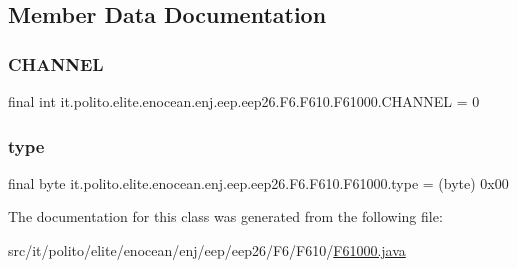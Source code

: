 \subsection{Member Data Documentation}
\hypertarget{classit_1_1polito_1_1elite_1_1enocean_1_1enj_1_1eep_1_1eep26_1_1_f6_1_1_f610_1_1_f61000_a3d5ee9532f23a1edda0fef17ab394f12}{}\label{classit_1_1polito_1_1elite_1_1enocean_1_1enj_1_1eep_1_1eep26_1_1_f6_1_1_f610_1_1_f61000_a3d5ee9532f23a1edda0fef17ab394f12} 
\subsubsection{\texorpdfstring{C\+H\+A\+N\+N\+EL}{CHANNEL}}
{\footnotesize\ttfamily final int it.\+polito.\+elite.\+enocean.\+enj.\+eep.\+eep26.\+F6.\+F610.\+F61000.\+C\+H\+A\+N\+N\+EL = 0\hspace{0.3cm}{\ttfamily [static]}}

\hypertarget{classit_1_1polito_1_1elite_1_1enocean_1_1enj_1_1eep_1_1eep26_1_1_f6_1_1_f610_1_1_f61000_a11e1826df8ee91b964ea89b95c5b37f0}{}\label{classit_1_1polito_1_1elite_1_1enocean_1_1enj_1_1eep_1_1eep26_1_1_f6_1_1_f610_1_1_f61000_a11e1826df8ee91b964ea89b95c5b37f0} 
\subsubsection{\texorpdfstring{type}{type}}
{\footnotesize\ttfamily final byte it.\+polito.\+elite.\+enocean.\+enj.\+eep.\+eep26.\+F6.\+F610.\+F61000.\+type = (byte) 0x00\hspace{0.3cm}{\ttfamily [static]}}



The documentation for this class was generated from the following file\+:\begin{DoxyCompactItemize}
\item 
src/it/polito/elite/enocean/enj/eep/eep26/\+F6/\+F610/\hyperlink{_f61000_8java}{F61000.\+java}\end{DoxyCompactItemize}
